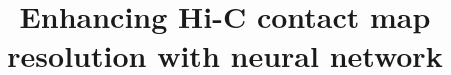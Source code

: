 \documentclass{article}
\begin{document}
\title{Enhancing Hi-C contact map resolution with neural network}
\author{}
\maketitle
\tableofcontents
\newpage
    
    
\end{document}
